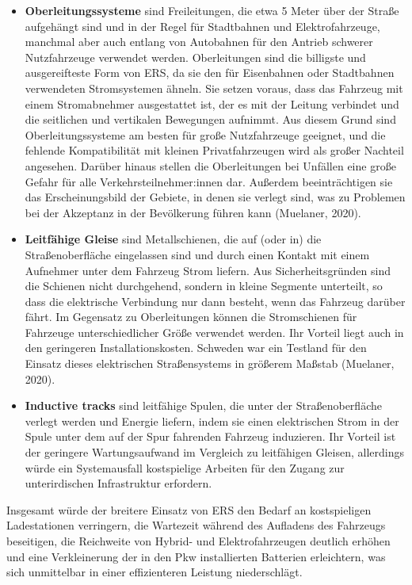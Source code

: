 \documentclass[
]{book}
\begin{document}
\begin{itemize}
\item
  \textbf{Oberleitungssysteme} sind Freileitungen, die etwa 5 Meter über der Straße aufgehängt sind und in der Regel für Stadtbahnen und Elektrofahrzeuge, manchmal aber auch entlang von Autobahnen für den Antrieb schwerer Nutzfahrzeuge verwendet werden. Oberleitungen sind die billigste und ausgereifteste Form von ERS, da sie den für Eisenbahnen oder Stadtbahnen verwendeten Stromsystemen ähneln. Sie setzen voraus, dass das Fahrzeug mit einem Stromabnehmer ausgestattet ist, der es mit der Leitung verbindet und die seitlichen und vertikalen Bewegungen aufnimmt. Aus diesem Grund sind Oberleitungssysteme am besten für große Nutzfahrzeuge geeignet, und die fehlende Kompatibilität mit kleinen Privatfahrzeugen wird als großer Nachteil angesehen. Darüber hinaus stellen die Oberleitungen bei Unfällen eine große Gefahr für alle Verkehrsteilnehmer:innen dar. Außerdem beeinträchtigen sie das Erscheinungsbild der Gebiete, in denen sie verlegt sind, was zu Problemen bei der Akzeptanz in der Bevölkerung führen kann (Muelaner, 2020).
\item
  \textbf{Leitfähige Gleise} sind Metallschienen, die auf (oder in) die Straßenoberfläche eingelassen sind und durch einen Kontakt mit einem Aufnehmer unter dem Fahrzeug Strom liefern. Aus Sicherheitsgründen sind die Schienen nicht durchgehend, sondern in kleine Segmente unterteilt, so dass die elektrische Verbindung nur dann besteht, wenn das Fahrzeug darüber fährt. Im Gegensatz zu Oberleitungen können die Stromschienen für Fahrzeuge unterschiedlicher Größe verwendet werden. Ihr Vorteil liegt auch in den geringeren Installationskosten. Schweden war ein Testland für den Einsatz dieses elektrischen Straßensystems in größerem Maßstab (Muelaner, 2020).
\item
  \textbf{Inductive tracks} sind leitfähige Spulen, die unter der Straßenoberfläche verlegt werden und Energie liefern, indem sie einen elektrischen Strom in der Spule unter dem auf der Spur fahrenden Fahrzeug induzieren. Ihr Vorteil ist der geringere Wartungsaufwand im Vergleich zu leitfähigen Gleisen, allerdings würde ein Systemausfall kostspielige Arbeiten für den Zugang zur unterirdischen Infrastruktur erfordern.
\end{itemize}

Insgesamt würde der breitere Einsatz von ERS den Bedarf an kostspieligen Ladestationen verringern, die Wartezeit während des Aufladens des Fahrzeugs beseitigen, die Reichweite von Hybrid- und Elektrofahrzeugen deutlich erhöhen und eine Verkleinerung der in den Pkw installierten Batterien erleichtern, was sich unmittelbar in einer effizienteren Leistung niederschlägt.
\end{document}
